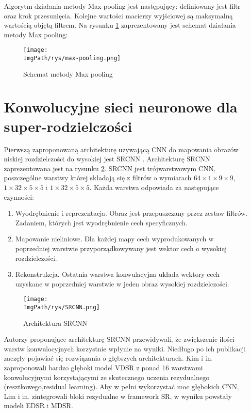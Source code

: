 \documentclass[a4paper,12pt,twoside,openany]{report}
\newcommand{\ImgPath}{.}
\begin{document}
	Algorytm działania metody Max pooling jest następujący: definiowany jest filtr oraz krok przesunięcia. Kolejne wartości macierzy wyjściowej są maksymalną wartością objętą filtrem. Na rysunku \ref{schematMaxPooling} zaprezentowany jest schemat działania metody Max pooling:

	\begin{figure}[!htbp]
		\begin{center}
			\centering
			\texttt{[image: \\ImgPath/rys/max-pooling.png]}
		\end{center}
		\caption{Schemat metody Max pooling}
		\label{schematMaxPooling}
	\end{figure}

\section{Konwolucyjne sieci neuronowe dla super-rodzielczości}
	Pierwszą zaproponowaną architekturę używającą CNN do mapowania obrazów niskiej rozdzielczości do wysokiej jest SRCNN \cite{SRCNN}. Architekturę SRCNN zaprezentowana jest na rysunku \ref{archSRCNN}. SRCNN jest trójwarstwowym CNN, poszczególne warstwy której składają się z filtrów o wymiarach $64 \times 1 \times 9 \times 9$, $1 \times 32 \times 5 \times 5$ i $1 \times 32 \times 5 \times 5$.
	Każda warstwa odpowiada za następujące czynności:
	\begin{enumerate}
		\item Wyodrębnienie i reprezentacja. Obraz jest przepuszczany przez zestaw filtrów. Zadaniem, których jest wyodrębnienie cech specyficznych.  
		\item Mapowanie nieliniowe. Dla każdej mapy cech wyprodukowanych w poprzedniej warstwie przyporządkowywany jest wektor cech o wysokiej rozdzielczości.
		\item Rekonstrukcja. Ostatnia warstwa konwulacyjna układa wektory cech uzyskane w poprzedniej warstwie w jeden obraz wysokiej rozdzielczości.
	\end{enumerate}
	\begin{figure}[!htbp]
		\begin{center}
			\centering
			\texttt{[image: \\ImgPath/rys/SRCNN.png]}
		\end{center}
		\caption{Architektura SRCNN}
		\label{archSRCNN}
	\end{figure}
	
	Autorzy proponujące architekturę SRCNN przewidywali, że zwiększenie ilości warstw konwulocyjnych korzystnie wpłynie na wyniki. Niedługo po ich publikacji zaczęły pojawiać się rozwiązania o głębszych architekturach. Kim i in. zaproponowali bardzo głęboki model VDSR z ponad 16 warstwami konwolucyjnymi korzystającymi ze skutecznego uczenia rezydualnego (resztkowego,residual learning). Aby w pełni wykorzystać moc głębokich CNN, Lim i in. zintegrowali bloki rezydualne w framework SR, w wyniku powstały modeli EDSR i MDSR.
\end{document}
